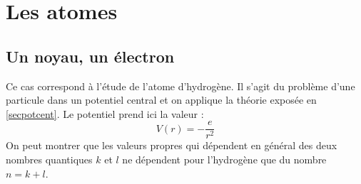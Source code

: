 \documentclass[12pt]{book}
\begin{document}
\section{Les atomes}\label{secatomemq}
\subsection{Un noyau, un \'electron}\label{sechydrog}
Ce cas correspond \`a l'\'etude de l'atome d'hydrog\`ene. Il s'agit du
probl\`eme d'une particule dans un potentiel central et on applique la
th\'eorie expos\'ee en \ref{secpotcent}. Le potentiel prend ici la
valeur :
\begin{equation}
V(r)=-\frac{e}{r^2}
\end{equation}
On peut montrer que les valeurs propres qui d\'ependent en g\'en\'eral
des deux nombres quantiques $k$ et $l$ ne d\'ependent pour
l'hydrog\`ene que du nombre $n=k+l$.
\end{document}

